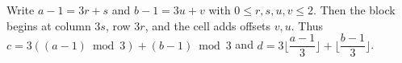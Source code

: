 Write $a-1=3r+s$ and $b-1=3u+v$ with $0\le r,s,u,v\le2$. Then the block begins at column $3s$, row $3r$, and the cell adds offsets $v,u$. Thus $\boxed{c=3((a-1)\bmod3)+(b-1)\bmod3}$ and $\boxed{d=3\lfloor\dfrac{a-1}{3}\rfloor+\lfloor\dfrac{b-1}{3}\rfloor}$.
